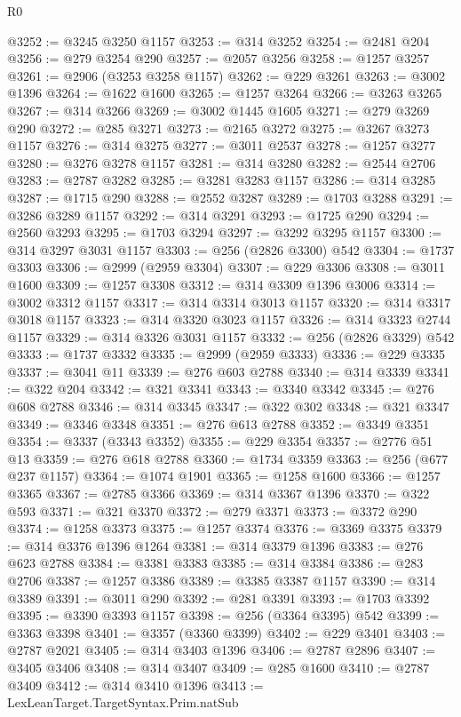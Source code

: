 \begin{lexlean}{R0}
\begin{coremodule}
@3252 := @3245 @3250 @1157
@3253 := @314 @3252
@3254 := @2481 @204
@3256 := @279 @3254 @290
@3257 := @2057 @3256
@3258 := @1257 @3257
@3261 := @2906 (@3253 @3258 @1157)
@3262 := @229 @3261
@3263 := @3002 @1396
@3264 := @1622 @1600
@3265 := @1257 @3264
@3266 := @3263 @3265
@3267 := @314 @3266
@3269 := @3002 @1445 @1605
@3271 := @279 @3269 @290
@3272 := @285 @3271
@3273 := @2165 @3272
@3275 := @3267 @3273 @1157
@3276 := @314 @3275
@3277 := @3011 @2537
@3278 := @1257 @3277
@3280 := @3276 @3278 @1157
@3281 := @314 @3280
@3282 := @2544 @2706
@3283 := @2787 @3282
@3285 := @3281 @3283 @1157
@3286 := @314 @3285
@3287 := @1715 @290
@3288 := @2552 @3287
@3289 := @1703 @3288
@3291 := @3286 @3289 @1157
@3292 := @314 @3291
@3293 := @1725 @290
@3294 := @2560 @3293
@3295 := @1703 @3294
@3297 := @3292 @3295 @1157
@3300 := @314 @3297 @3031 @1157
@3303 := @256 (@2826 @3300) @542
@3304 := @1737 @3303
@3306 := @2999 (@2959 @3304)
@3307 := @229 @3306
@3308 := @3011 @1600
@3309 := @1257 @3308
@3312 := @314 @3309 @1396 @3006
@3314 := @3002 @3312 @1157
@3317 := @314 @3314 @3013 @1157
@3320 := @314 @3317 @3018 @1157
@3323 := @314 @3320 @3023 @1157
@3326 := @314 @3323 @2744 @1157
@3329 := @314 @3326 @3031 @1157
@3332 := @256 (@2826 @3329) @542
@3333 := @1737 @3332
@3335 := @2999 (@2959 @3333)
@3336 := @229 @3335
@3337 := @3041 @11
@3339 := @276 @603 @2788
@3340 := @314 @3339
@3341 := @322 @204
@3342 := @321 @3341
@3343 := @3340 @3342
@3345 := @276 @608 @2788
@3346 := @314 @3345
@3347 := @322 @302
@3348 := @321 @3347
@3349 := @3346 @3348
@3351 := @276 @613 @2788
@3352 := @3349 @3351
@3354 := @3337 (@3343 @3352)
@3355 := @229 @3354
@3357 := @2776 @51 @13
@3359 := @276 @618 @2788
@3360 := @1734 @3359
@3363 := @256 (@677 @237 @1157)
@3364 := @1074 @1901
@3365 := @1258 @1600
@3366 := @1257 @3365
@3367 := @2785 @3366
@3369 := @314 @3367 @1396
@3370 := @322 @593
@3371 := @321 @3370
@3372 := @279 @3371
@3373 := @3372 @290
@3374 := @1258 @3373
@3375 := @1257 @3374
@3376 := @3369 @3375
@3379 := @314 @3376 @1396 @1264
@3381 := @314 @3379 @1396
@3383 := @276 @623 @2788
@3384 := @3381 @3383
@3385 := @314 @3384
@3386 := @283 @2706
@3387 := @1257 @3386
@3389 := @3385 @3387 @1157
@3390 := @314 @3389
@3391 := @3011 @290
@3392 := @281 @3391
@3393 := @1703 @3392
@3395 := @3390 @3393 @1157
@3398 := @256 (@3364 @3395) @542
@3399 := @3363 @3398
@3401 := @3357 (@3360 @3399)
@3402 := @229 @3401
@3403 := @2787 @2021
@3405 := @314 @3403 @1396
@3406 := @2787 @2896
@3407 := @3405 @3406
@3408 := @314 @3407
@3409 := @285 @1600
@3410 := @2787 @3409
@3412 := @314 @3410 @1396
@3413 := LexLeanTarget.TargetSyntax.Prim.natSub

\end{coremodule}
\end{lexlean}
